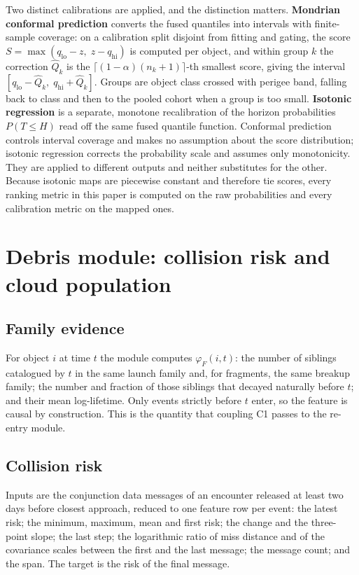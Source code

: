 \documentclass[3p,times,twocolumn]{elsarticle}
\begin{document}
Two distinct calibrations are applied, and the distinction matters.
\textbf{Mondrian conformal prediction} converts the fused quantiles into
intervals with finite-sample coverage: on a calibration split disjoint
from fitting and gating, the score
\(S = \max(q_{\text{lo}} - z,\; z - q_{\text{hi}})\) is computed per
object, and within group \(k\) the correction \(\hat{Q}_k\) is the
\(\lceil (1-\alpha)(n_k+1) \rceil\)-th smallest score, giving the
interval \([q_{\text{lo}} - \hat{Q}_k,\; q_{\text{hi}} + \hat{Q}_k]\).
Groups are object class crossed with perigee band, falling back to class
and then to the pooled cohort when a group is too small.
\textbf{Isotonic regression} is a separate, monotone recalibration of
the horizon probabilities \(P(T \leq H)\) read off the same fused
quantile function. Conformal prediction controls interval coverage and
makes no assumption about the score distribution; isotonic regression
corrects the probability scale and assumes only monotonicity. They are
applied to different outputs and neither substitutes for the other.
Because isotonic maps are piecewise constant and therefore tie scores,
every ranking metric in this paper is computed on the raw probabilities
and every calibration metric on the mapped ones.

\section{Debris module: collision risk and cloud
population}\label{sec:debris}

\subsection{Family evidence}\label{family-evidence}

For object \(i\) at time \(t\) the module computes \(\varphi_F(i,t)\):
the number of siblings catalogued by \(t\) in the same launch family
and, for fragments, the same breakup family; the number and fraction of
those siblings that decayed naturally before \(t\); and their mean
log-lifetime. Only events strictly before \(t\) enter, so the feature is
causal by construction. This is the quantity that coupling C1 passes to
the re-entry module.

\subsection{Collision risk}\label{collision-risk}

Inputs are the conjunction data messages of an encounter released at
least two days before closest approach, reduced to one feature row per
event: the latest risk; the minimum, maximum, mean and first risk; the
change and the three-point slope; the last step; the logarithmic ratio
of miss distance and of the covariance scales between the first and the
last message; the message count; and the span. The target is the risk of
the final message.
\end{document}
